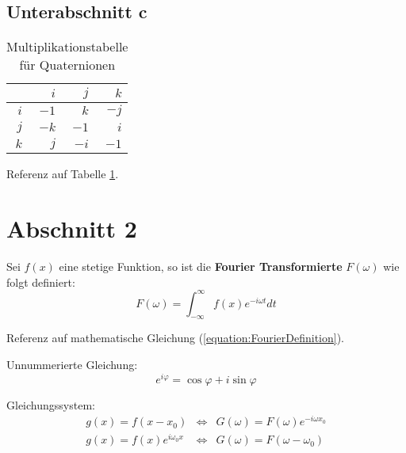 \subsection{Unterabschnitt c}

\begin{table}[ht]
	\centering
	\begin{tabular}{r|rrr}
		    & $i$ & $j$ & $k$ \\ \hline
		$i$ &$-1$ & $k$ &$-j$ \\
		$j$ &$-k$ &$-1$ & $i$ \\
		$k$ & $j$ &$-i$ &$-1$
	\end{tabular}
	\caption{
		Multiplikationstabelle für Quaternionen
	}
	\label{table:Quaternions}
\end{table}

Referenz auf Tabelle \ref{table:Quaternions}.

\section{Abschnitt 2}
\label{section:MathematicalStuff}

Sei $f(x)$ eine stetige Funktion, so ist die \textbf{Fourier Transformierte}
$F(\omega)$ wie folgt definiert:
\begin{equation}
\label{equation:FourierDefinition}
	F(\omega) = \int_{-\infty}^{\infty} f(x) e^{-i\omega t} dt
\end{equation}

Referenz auf mathematische Gleichung (\ref{equation:FourierDefinition}).

Unnummerierte Gleichung:
\begin{equation*}
	e^{i\varphi} = \cos\varphi + i \sin\varphi
\end{equation*}

Gleichungssystem:
\begin{eqnarray}
	g(x) = f(x - x_0) & \Leftrightarrow &
		G(\omega) = F(\omega) e^{-i\omega x_0} \\
	g(x) = f(x) e^{i\omega_0 x} & \Leftrightarrow &
		G(\omega) = F(\omega - \omega_0)
\end{eqnarray}
